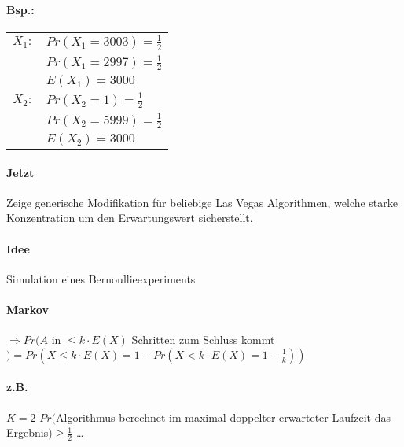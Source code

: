 \paragraph*{Bsp.:}
\begin{tabular}{l l}
$X_1 :$ & $Pr(X_1 = 3003) = \frac{1}{2}$ \\
 & $Pr(X_1 = 2997) = \frac{1}{2}$ \\
 & $E(X_1) = 3000$ \\
$X_2 :$ & $Pr(X_2 = 1) = \frac{1}{2}$ \\
 & $Pr(X_2 = 5999) = \frac{1}{2}$ \\
 & $E(X_2) = 3000$ \\
\end{tabular} 


\paragraph*{Jetzt} Zeige generische Modifikation für beliebige Las Vegas Algorithmen, welche starke Konzentration um den Erwartungswert sicherstellt.

\paragraph*{Idee} Simulation eines Bernoullieexperiments \\

\paragraph*{Markov} $\Rightarrow Pr(A$ in $\leq k \cdot E(X)$ Schritten zum Schluss kommt $) = Pr(X \leq k \cdot E(X) = 1 - Pr(X<k \cdot E(X) = 1 - \frac{1}{k}))$ 

\paragraph*{z.B.} $K=2$ $Pr($Algorithmus berechnet im maximal doppelter erwarteter Laufzeit das Ergebnis$) \geq \frac{1}{2}$ \dots